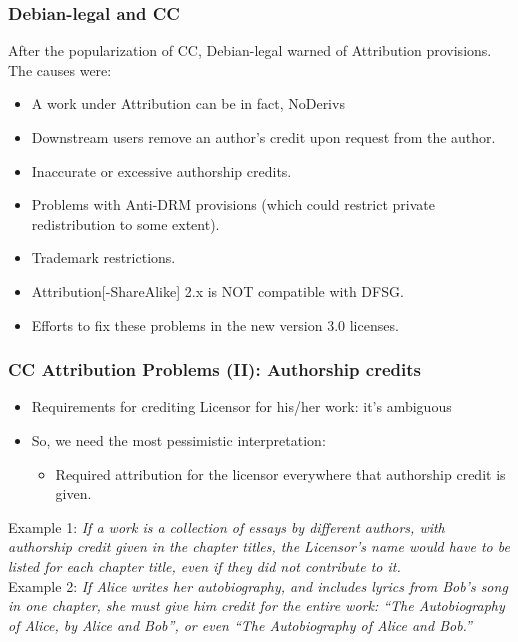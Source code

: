 
\begin{frame}
\frametitle{Debian-legal and CC}

After the popularization of CC, Debian-legal warned of
Attribution provisions. The causes were:

\begin{itemize}
\item A work under Attribution can be in fact, NoDerivs 
\item Downstream users remove an author's credit upon request from the author.
\item Inaccurate or excessive authorship credits.
\item Problems with Anti-DRM provisions (which could restrict private redistribution to some extent).
\item Trademark restrictions.
\item Attribution[-ShareAlike] 2.x is NOT compatible with DFSG. 
\item Efforts to fix these problems in the new version 3.0 licenses.

\end{itemize}


\end{frame}



\begin{frame}
\frametitle{CC Attribution Problems (II): Authorship credits}

\begin{itemize}
\item Requirements for crediting Licensor for his/her work: it's ambiguous
\item So, we need the most pessimistic interpretation:
\begin{itemize}
\item Required attribution for the licensor everywhere that authorship credit is given.
\end{itemize}
\end{itemize}
Example 1: {\it If a work is a collection of essays by different authors, with authorship credit given in the chapter titles, the Licensor's name would have to be listed for each chapter title, even if they did not contribute to it.}\\
Example 2: {\it If Alice writes her autobiography, and includes lyrics from Bob's song in one chapter, she must give him credit for the entire work: ``The Autobiography of Alice, by Alice and Bob'', or even ``The Autobiography of Alice and Bob.''}
\end{frame}

